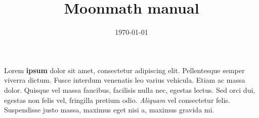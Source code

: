 \documentclass[a4paper]{book}
\title{Moonmath manual}
\author{}
\date{\today}
\theoremstyle{plain}
\begin{document}
\maketitle

Lorem \textbf{ipsum} dolor sit amet, consectetur adipiscing elit. Pellentesque semper viverra dictum.  Fusce interdum venenatis leo varius vehicula. Etiam ac massa dolor. Quisque vel massa faucibus, facilisis nulla nec, egestas lectus. Sed orci dui, egestas non felis vel, fringilla pretium odio. \textit{Aliquam} vel consectetur felis. Suspendisse justo massa, maximus eget nisi a, maximus gravida mi.




\end{document}
